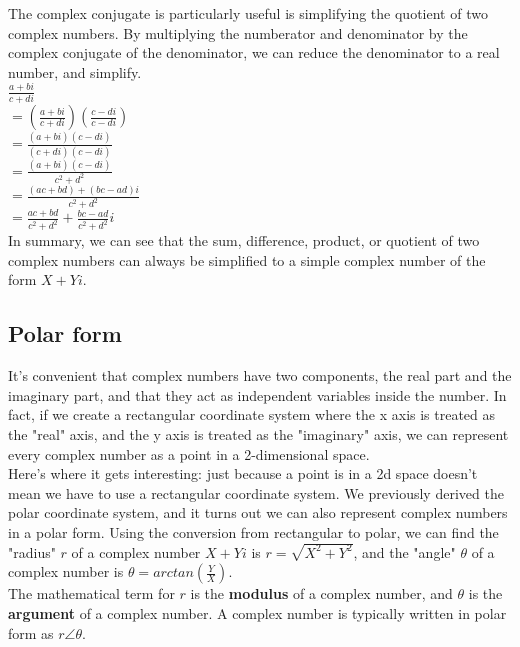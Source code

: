 The complex conjugate is particularly useful is simplifying the quotient of two complex numbers.  By multiplying the numberator and denominator by the complex conjugate of the denominator, we can reduce the denominator to a real number, and simplify.\\

\tab$\frac{a+bi}{c+di}$\\

\tab$= (\frac{a+bi}{c+di})(\frac{c-di}{c-di})$\\

\tab$= \frac{(a+bi)(c-di)}{(c+di)(c-di)}$\\

\tab$= \frac{(a+bi)(c-di)}{c^2+d^2}$\\

\tab$= \frac{(ac+bd) + (bc-ad)i}{c^2+d^2}$\\

\tab$= \frac{ac+bd}{c^2+d^2} + \frac{bc-ad}{c^2+d^2}i$\\

In summary, we can see that the sum, difference, product, or quotient of two complex numbers can always be simplified to a simple complex number of the form $X + Yi$.\\

\subsection{Polar form}

It's convenient that complex numbers have two components, the real part and the imaginary part, and that they act as independent variables inside the number.  In fact, if we create a rectangular coordinate system where the x axis is treated as the "real" axis, and the y axis is treated as the "imaginary" axis, we can represent every complex number as a point in a 2-dimensional space.\\

Here's where it gets interesting:  just because a point is in a 2d space doesn't mean we have to use a rectangular coordinate system.  We previously derived the polar coordinate system, and it turns out we can also represent complex numbers in a polar form.  Using the conversion from rectangular to polar, we can find the "radius" $r$ of a complex number $X + Yi$ is $r = \sqrt{X^2 + Y^2}$, and the "angle" $\theta$ of a complex number is $\theta = arctan(\frac{Y}{X})$.\\

The mathematical term for $r$ is the {\bfseries modulus} of a complex number, and $\theta$ is the {\bfseries argument} of a complex number.  A complex number is typically written in polar form as $r\angle\theta$.\\

